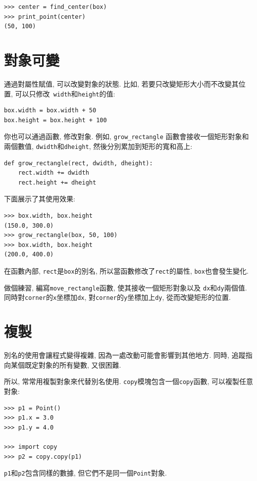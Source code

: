 \documentclass[10pt]{book}
\begin{document}
\begin{verbatim}
>>> center = find_center(box)
>>> print_point(center)
(50, 100)
\end{verbatim}
%

\section{對象可變}

通過對屬性賦值, 可以改變對象的狀態. 
比如, 若要只改變矩形大小而不改變其位置, 可以只修改{\tt
width}和{\tt height}的值:

\begin{verbatim}
box.width = box.width + 50
box.height = box.height + 100
\end{verbatim}
%
你也可以通過函數, 修改對象. 例如, 
\verb"grow_rectangle" 函數會接收一個矩形對象和兩個數值, 
{\tt dwidth}和{\tt dheight}, 然後分別累加到矩形的寬和高上:

\begin{verbatim}
def grow_rectangle(rect, dwidth, dheight):
    rect.width += dwidth
    rect.height += dheight
\end{verbatim}
%
下面展示了其使用效果:

\begin{verbatim}
>>> box.width, box.height
(150.0, 300.0)
>>> grow_rectangle(box, 50, 100)
>>> box.width, box.height
(200.0, 400.0)
\end{verbatim}
%
在函數內部, {\tt rect}是{\tt box}的別名, 所以當函數修改了{\tt rect}的屬性, 
{\tt box}也會發生變化. 

做個練習, 編寫\verb"move_rectangle"函數, 使其接收一個矩形對象以及
{\tt dx}和{\tt dy}兩個值. 
同時對{\tt corner}的{\tt x}坐標加{\tt dx}, 
對{\tt corner}的{\tt y}坐標加上{\tt dy}, 
從而改變矩形的位置. 


\section{複製}
\label{copying}

別名的使用會讓程式變得複雜, 因為一處改動可能會影響到其他地方. 
同時, 追蹤指向某個既定對象的所有變數, 又很困難. 

所以, 常常用複製對象來代替別名使用. 
{\tt copy}模塊包含一個{\tt copy}函數, 可以複製任意對象:

\begin{verbatim}
>>> p1 = Point()
>>> p1.x = 3.0
>>> p1.y = 4.0

>>> import copy
>>> p2 = copy.copy(p1)
\end{verbatim}
%
{\tt p1}和{\tt p2}包含同樣的數據, 但它們不是同一個{\tt Point}對象.
\end{document}
